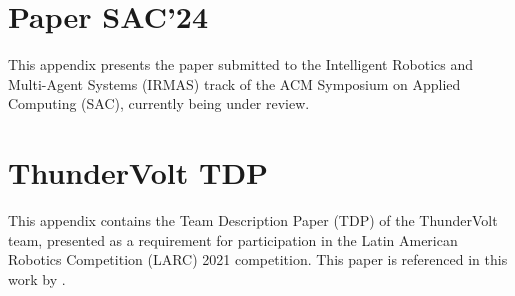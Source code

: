 \appendix

\chapter{Paper SAC'24}
\label{appendix:paper}

This appendix presents the paper submitted to the Intelligent Robotics and Multi-Agent Systems (IRMAS) track of the ACM Symposium on Applied Computing (SAC), currently being under review.



\chapter{ThunderVolt TDP}
\label{appendix:tdp}

This appendix contains the Team Description Paper (TDP) of the ThunderVolt team, presented as a requirement for participation in the Latin American Robotics Competition (LARC) 2021 competition. This paper is referenced in this work by \cite{TDPThunderVolt}.


